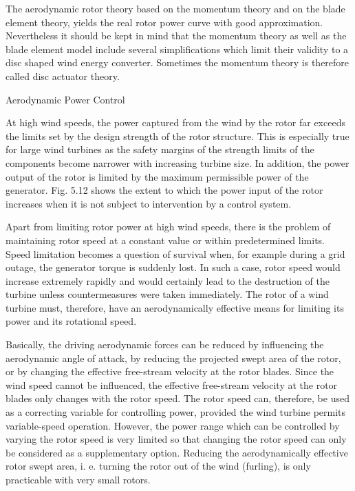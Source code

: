The aerodynamic rotor theory based on the momentum theory and on the blade element theory, yields the real rotor power curve with good approximation. Nevertheless it should be kept in mind that the momentum theory as well as the blade element model include several simplifications which limit their validity to a disc shaped wind energy converter. Sometimes the momentum theory is therefore called disc actuator theory.

Aerodynamic Power Control

At high wind speeds, the power captured from the wind by the rotor far exceeds the limits set by the design strength of the rotor structure. This is especially true for large wind turbines as the safety margins of the strength limits of the components become narrower with increasing turbine size. In addition, the power output of the rotor is limited by the maximum permissible power of the generator. Fig. 5.12 shows the extent to which the power input of the rotor increases when it is not subject to intervention by a control system.

Apart from limiting rotor power at high wind speeds, there is the problem of maintaining rotor speed at a constant value or within predetermined limits. Speed limitation becomes a question of survival when, for example during a grid outage, the generator torque is suddenly lost. %
In such a case, rotor speed would increase extremely rapidly and would certainly lead to the destruction of the turbine unless countermeasures were taken immediately. The rotor of a wind turbine must, therefore, have an aerodynamically effective means for limiting its power and its rotational speed.

Basically, the driving aerodynamic forces can be reduced by influencing the aerodynamic angle of attack, by reducing the projected swept area of the rotor, or by changing the effective free-stream velocity at the rotor blades. Since the wind speed cannot be influenced, the effective free-stream velocity at the rotor blades only changes with the rotor speed. The rotor speed can, therefore, be used as a correcting variable for controlling power, provided the wind turbine permits variable-speed operation. However, the power range which can be controlled by varying the rotor speed is very limited so that changing the rotor speed can only be considered as a supplementary option. Reducing the aerodynamically effective rotor swept area, i. e. turning the rotor out of the wind (furling), is only practicable with very small rotors.

